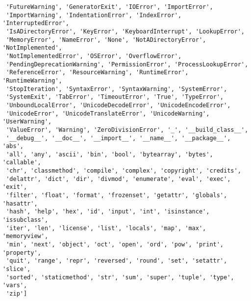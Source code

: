 \documentclass{article}
\begin{document}
\begin{CJK}{UTF8}{gbsn}
\begin{verbatim}
 'FutureWarning', 'GeneratorExit', 'IOError', 'ImportError',
 'ImportWarning', 'IndentationError', 'IndexError', 'InterruptedError',
 'IsADirectoryError', 'KeyError', 'KeyboardInterrupt', 'LookupError',
 'MemoryError', 'NameError', 'None', 'NotADirectoryError', 'NotImplemented',
 'NotImplementedError', 'OSError', 'OverflowError',
 'PendingDeprecationWarning', 'PermissionError', 'ProcessLookupError',
 'ReferenceError', 'ResourceWarning', 'RuntimeError', 'RuntimeWarning',
 'StopIteration', 'SyntaxError', 'SyntaxWarning', 'SystemError',
 'SystemExit', 'TabError', 'TimeoutError', 'True', 'TypeError',
 'UnboundLocalError', 'UnicodeDecodeError', 'UnicodeEncodeError',
 'UnicodeError', 'UnicodeTranslateError', 'UnicodeWarning', 'UserWarning',
 'ValueError', 'Warning', 'ZeroDivisionError', '_', '__build_class__',
 '__debug__', '__doc__', '__import__', '__name__', '__package__', 'abs',
 'all', 'any', 'ascii', 'bin', 'bool', 'bytearray', 'bytes', 'callable',
 'chr', 'classmethod', 'compile', 'complex', 'copyright', 'credits',
 'delattr', 'dict', 'dir', 'divmod', 'enumerate', 'eval', 'exec', 'exit',
 'filter', 'float', 'format', 'frozenset', 'getattr', 'globals', 'hasattr',
 'hash', 'help', 'hex', 'id', 'input', 'int', 'isinstance', 'issubclass',
 'iter', 'len', 'license', 'list', 'locals', 'map', 'max', 'memoryview',
 'min', 'next', 'object', 'oct', 'open', 'ord', 'pow', 'print', 'property',
 'quit', 'range', 'repr', 'reversed', 'round', 'set', 'setattr', 'slice',
 'sorted', 'staticmethod', 'str', 'sum', 'super', 'tuple', 'type', 'vars',
 'zip']
\end{verbatim}

\end{CJK}
\end{document}
